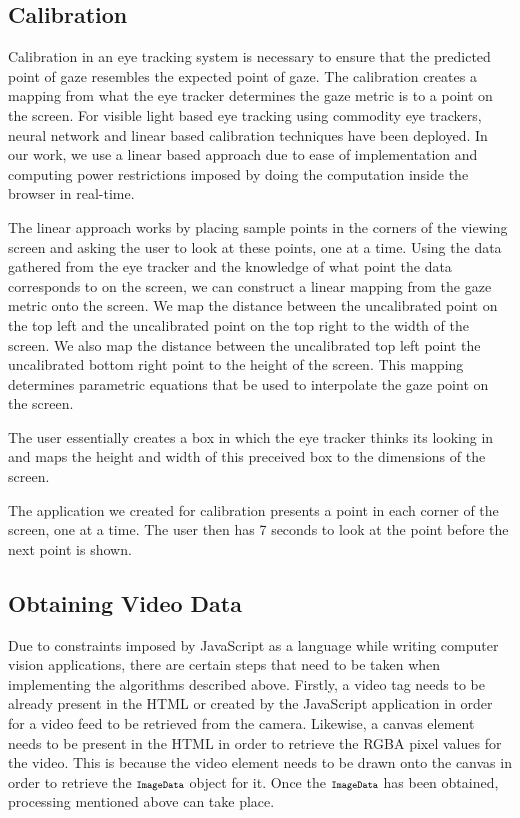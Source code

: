 \documentclass[annual]{acmsiggraph}
\newcommand{\Acronym}[1]{\ensuremath{{\small{\texttt{#1}}}}}
\begin{document}
\subsection{Calibration}

Calibration in an eye tracking system is necessary to ensure that the predicted
point of gaze resembles the expected point of gaze. The calibration creates a
mapping from what the eye tracker determines the gaze metric is to a point on
the screen. For visible light based eye tracking using commodity eye trackers,
neural network \cite{holland2012eye} and linear based calibration techniques
have been deployed. In our work, we use a linear based approach due to ease of
implementation and computing power restrictions imposed by doing the
computation inside the browser in real-time.

The linear approach works by placing sample points in the corners of the
viewing screen and asking the user to look at these points, one at a time.
Using the data gathered from the eye tracker and the knowledge of what point
the data corresponds to on the screen, we can construct a linear mapping from
the gaze metric onto the screen. We map the distance between the uncalibrated
point on the top left and  the uncalibrated point on the top right to the width
of the screen.  We also map the distance between the uncalibrated top left
point the uncalibrated bottom right point to the height of the screen. This
mapping determines parametric equations that be used to interpolate the gaze
point on the screen.

The user essentially creates a box in which the eye tracker thinks its looking
in and maps the height and width of this preceived box to the dimensions of the
screen.

The application we created for calibration presents a point in each corner of
the screen, one at a time. The user then has 7 seconds to look at the point
before the next point is shown.

\subsection{Obtaining Video Data}

%
%
%

Due to constraints imposed by JavaScript as a language while writing computer
vision applications, there are certain steps that need to be taken when
implementing the algorithms described above. Firstly, a video tag needs to be
already present in the HTML or created by the JavaScript application in order
for a video feed to be retrieved from the camera. Likewise, a canvas element
needs to be present in the HTML in order to retrieve the RGBA pixel values for
the video.  This is because the video element needs to be drawn onto the canvas
in order to retrieve the $\Acronym{ImageData}$ object for it. Once the
$\Acronym{ImageData}$ has been obtained, processing mentioned above can take
place.
\end{document}
